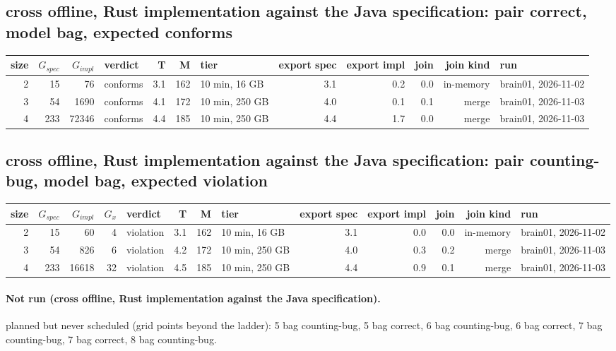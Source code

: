 \documentclass[10pt]{article}
\begin{document}
\subsection*{cross offline, Rust implementation against the Java specification: pair \textsf{correct}, model bag, expected conforms}
\begin{longtable}{@{}rrrlrrlrrrrl@{}}
\toprule
size & $G_{\mathit{spec}}$ & $G_{\mathit{impl}}$ & verdict & T & M & tier & export spec & export impl & join & join kind & run \\
\midrule
\endhead
\color{red} 2 & 15 & 76 & conforms & 3.1 & 162 & 10 min, 16 GB & 3.1 & 0.2 & 0.0 & in-memory & brain01, 2026-11-02 \\
\color{blue} 3 & 54 & 1690 & conforms & 4.1 & 172 & 10 min, 250 GB & 4.0 & 0.1 & 0.1 & merge & brain01, 2026-11-03 \\
\color{blue} 4 & 233 & 72346 & conforms & 4.4 & 185 & 10 min, 250 GB & 4.4 & 1.7 & 0.0 & merge & brain01, 2026-11-03 \\
\bottomrule
\end{longtable}
\subsection*{cross offline, Rust implementation against the Java specification: pair \textsf{counting-bug}, model bag, expected violation}
\begin{longtable}{@{}rrrrlrrlrrrrl@{}}
\toprule
size & $G_{\mathit{spec}}$ & $G_{\mathit{impl}}$ & $G_x$ & verdict & T & M & tier & export spec & export impl & join & join kind & run \\
\midrule
\endhead
\color{red} 2 & 15 & 60 & 4 & violation & 3.1 & 162 & 10 min, 16 GB & 3.1 & 0.0 & 0.0 & in-memory & brain01, 2026-11-02 \\
\color{blue} 3 & 54 & 826 & 6 & violation & 4.2 & 172 & 10 min, 250 GB & 4.0 & 0.3 & 0.2 & merge & brain01, 2026-11-03 \\
\color{blue} 4 & 233 & 16618 & 32 & violation & 4.5 & 185 & 10 min, 250 GB & 4.4 & 0.9 & 0.1 & merge & brain01, 2026-11-03 \\
\bottomrule
\end{longtable}
\paragraph{Not run (cross offline, Rust implementation against the Java specification).}
planned but never scheduled (grid points beyond the ladder): 5 bag counting-bug, 5 bag correct, 6 bag counting-bug, 6 bag correct, 7 bag counting-bug, 7 bag correct, 8 bag counting-bug.\par
\end{document}
